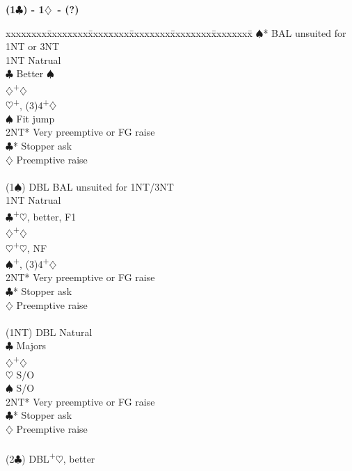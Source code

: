 \documentclass[10pt]{article}
\renewcommand{\c}{$\clubsuit$}
\renewcommand{\d}{$\diamondsuit$}
\newcommand{\h}{$\heartsuit$}
\newcommand{\s}{$\spadesuit$}
\newcommand{\p}{\textsuperscript{+}}
\newcommand{\x}{DBL}
\newenvironment{bidtable}[1][]
{\textbf{#1}
  \begin{adjustwidth}{1em}{}
    \addvspace{2pt}
    \begin{tabbing}
      xxxxxxxx\=xxxxxxxx\=xxxxxxxx\=xxxxxxxx\=xxxxxxxx\=xxxxxxxx\=\kill}
{\end{tabbing}\end{adjustwidth}\bigskip}%
\begin{document}
\begin{multicols*}{2}
\begin{bidtable}[(1\c) - 1\d\ - (?)]
       \s* \> BAL unsuited for 1NT or 3NT \\
       \> 1NT  \> Natrual                     \\
       \c  \> Better \s                   \\
       \d  {}\p\d                       \\
       \h  {}\p, (3)4\p\d               \\
       \s  \> Fit jump                    \\
       \> 2NT* \> Very preemptive or FG raise \\
       \c* \> Stopper ask                 \\
       \d  \> Preemptive raise            \\
                                              \\
(1\s)  \> \x   \> BAL unsuited for 1NT/3NT    \\
       \> 1NT  \> Natrual                     \\
       \c  {}\p\h, better, F1           \\
       \d  {}\p\d                       \\
       \h  {}\p\h, NF                   \\
       \s  {}\p, (3)4\p\d               \\
       \> 2NT* \> Very preemptive or FG raise \\
       \c* \> Stopper ask                 \\
       \d  \> Preemptive raise            \\
                                              \\
(1NT)  \> \x   \> Natural                     \\
       \c  \> Majors                      \\
       \d  {}\p\d                       \\
       \h  \> S/O                         \\
       \s  \> S/O                         \\
       \> 2NT* \> Very preemptive or FG raise \\
       \c* \> Stopper ask                 \\
       \d  \> Preemptive raise            \\
                                              \\
(2\c)  \> \x   {}\p\h, better               \\

\end{bidtable}
\end{multicols*}
\end{document}
